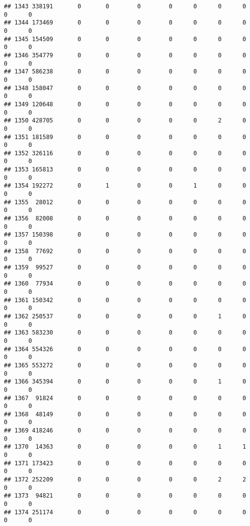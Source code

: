 \documentclass[
]{article}
\begin{document}
\begin{verbatim}
## 1343 338191       0       0        0        0      0      0      0     0      0
## 1344 173469       0       0        0        0      0      0      0     0      0
## 1345 154509       0       0        0        0      0      0      0     0      0
## 1346 354779       0       0        0        0      0      0      0     0      0
## 1347 586238       0       0        0        0      0      0      0     0      0
## 1348 158047       0       0        0        0      0      0      0     0      0
## 1349 120648       0       0        0        0      0      0      0     0      0
## 1350 428705       0       0        0        0      0      2      0     0      0
## 1351 181589       0       0        0        0      0      0      0     0      0
## 1352 326116       0       0        0        0      0      0      0     0      0
## 1353 165813       0       0        0        0      0      0      0     0      0
## 1354 192272       0       1        0        0      1      0      0     0      0
## 1355  28012       0       0        0        0      0      0      0     0      0
## 1356  82008       0       0        0        0      0      0      0     0      0
## 1357 150398       0       0        0        0      0      0      0     0      0
## 1358  77692       0       0        0        0      0      0      0     0      0
## 1359  99527       0       0        0        0      0      0      0     0      0
## 1360  77934       0       0        0        0      0      0      0     0      0
## 1361 150342       0       0        0        0      0      0      0     0      0
## 1362 250537       0       0        0        0      0      1      0     0      0
## 1363 583230       0       0        0        0      0      0      0     0      0
## 1364 554326       0       0        0        0      0      0      0     0      0
## 1365 553272       0       0        0        0      0      0      0     0      0
## 1366 345394       0       0        0        0      0      1      0     0      0
## 1367  91824       0       0        0        0      0      0      0     0      0
## 1368  48149       0       0        0        0      0      0      0     0      0
## 1369 418246       0       0        0        0      0      0      0     0      0
## 1370  14363       0       0        0        0      0      1      1     0      0
## 1371 173423       0       0        0        0      0      0      0     0      0
## 1372 252209       0       0        0        0      0      2      2     0      0
## 1373  94821       0       0        0        0      0      0      0     0      0
## 1374 251174       0       0        0        0      0      0      0     0      0

\end{verbatim}
\end{document}
